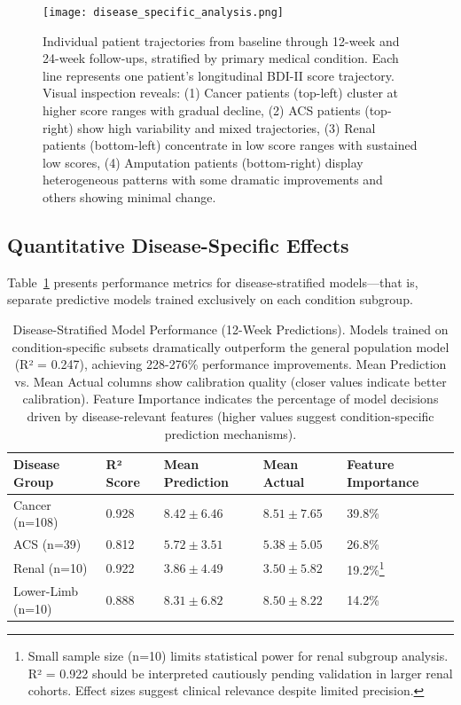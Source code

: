 \documentclass[conference]{IEEEtran}
\begin{document}
\begin{figure}[h]
    \centering
    \texttt{[image: disease\_specific\_analysis.png]}
    \caption{Individual patient trajectories from baseline through 12-week and 24-week follow-ups, stratified by primary medical condition. Each line represents one patient's longitudinal BDI-II score trajectory. Visual inspection reveals: (1) Cancer patients (top-left) cluster at higher score ranges with gradual decline, (2) ACS patients (top-right) show high variability and mixed trajectories, (3) Renal patients (bottom-left) concentrate in low score ranges with sustained low scores, (4) Amputation patients (bottom-right) display heterogeneous patterns with some dramatic improvements and others showing minimal change.}
    \label{fig:disease_specific_analysis}
\end{figure}

\subsection{Quantitative Disease-Specific Effects}

Table~\ref{tab:condition_performance} presents performance metrics for disease-stratified models—that is, separate predictive models trained exclusively on each condition subgroup.

\begin{table}[h]
\centering
\caption{Disease-Stratified Model Performance (12-Week Predictions). Models trained on condition-specific subsets dramatically outperform the general population model (R² = 0.247), achieving 228-276\% performance improvements. Mean Prediction vs. Mean Actual columns show calibration quality (closer values indicate better calibration). Feature Importance indicates the percentage of model decisions driven by disease-relevant features (higher values suggest condition-specific prediction mechanisms).}
\label{tab:condition_performance}
\begin{tabularx}{\linewidth}{XXXXX}
\hline
\textbf{Disease Group} & \textbf{R² Score} & \textbf{Mean Prediction} & \textbf{Mean Actual} & \textbf{Feature Importance}\\
\midrule
Cancer (n=108) & 0.928 & $8.42 \pm 6.46$ & $8.51 \pm 7.65$ & 39.8\%  \\
ACS (n=39) & 0.812 & $5.72 \pm 3.51$ & $5.38 \pm 5.05$ & 26.8\% \\
Renal (n=10) & 0.922 & $3.86 \pm 4.49$ & $3.50 \pm 5.82$ & 19.2\%\footnote{Small sample size (n=10) limits statistical power for renal subgroup analysis. R² = 0.922 should be interpreted cautiously pending validation in larger renal cohorts. Effect sizes suggest clinical relevance despite limited precision.} \\
Lower-Limb (n=10) & 0.888 & $8.31 \pm 6.82$ & $8.50 \pm 8.22$ & 14.2\% \\
\bottomrule
\end{tabularx}
\end{table}
\end{document}
